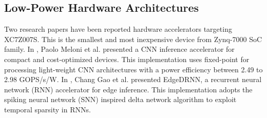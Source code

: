 \subsection{Low-Power Hardware Architectures}
Two research papers have been reported hardware accelerators targeting XC7Z007S. This is the smallest and most inexpensive device from Zynq-7000 SoC family. In \cite{meloni2019cnn}, Paolo Meloni et al. presented a CNN inference accelerator for compact and cost-optimized devices. This implementation uses fixed-point for processing light-weight CNN architectures with a power efficiency between 2.49 to 2.98 GOPS/s/W. In \cite{gao2020edgedrnn}, Chang Gao et al. presented EdgeDRNN, a recurrent neural network (RNN) accelerator for edge inference. This implementation adopts the spiking neural network (SNN) inspired delta network algorithm to exploit temporal sparsity in RNNs.